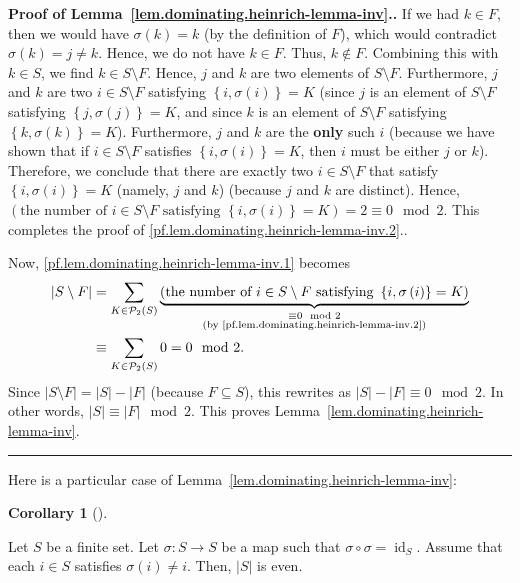 \documentclass[numbers=enddot,12pt,final,onecolumn,notitlepage]{scrartcl}%
\theoremstyle{definition}
\newtheorem{coro}[theo]{Corollary}
\newenvironment{corollary}[1][]
{\begin{coro}[#1]\begin{leftbar}}
{\end{leftbar}\end{coro}}
\newenvironment{proof}[1][Proof]{\noindent\textbf{#1.} }{\ \rule{0.5em}{0.5em}}
\let\sumnonlimits\sum
\renewcommand{\sum}{\sumnonlimits\limits}
\newcommand{\id}{\operatorname{id}}
\newcommand{\powset}[2][]{\ifthenelse{\equal{#2}{}}{\mathcal{P}\left(#1\right)}{\mathcal{P}_{#1}\left(#2\right)}}
\newcommand{\set}[1]{\left\{ #1 \right\}}
\newcommand{\abs}[1]{\left| #1 \right|}
\newcommand{\tup}[1]{\left( #1 \right)}
\begin{document}
\begin{proof}[Proof of Lemma~\ref{lem.dominating.heinrich-lemma-inv}.]
{If we had $k \in F$, then we would have $\sigma\tup{k} = k$ (by the
definition of $F$), which would contradict $\sigma\tup{k} = j \neq k$.
Hence, we do not have $k \in F$. Thus, $k \notin F$. Combining this
with $k \in S$, we find $k \in S \setminus F$. Hence, $j$ and $k$ are
two elements of $S \setminus F$. Furthermore, $j$ and $k$ are two
$i \in S \setminus F$ satisfying $\set{i, \sigma\tup{i}} = K$ (since
$j$ is an element of $S \setminus F$ satisfying
$\set{j, \sigma\tup{j}} = K$, and since $k$ is an element of
$S \setminus F$ satisfying $\set{k, \sigma\tup{k}} = K$). Furthermore,
$j$ and $k$ are the \textbf{only} such $i$ (because we have shown that
if $i \in S \setminus F$ satisfies $\set{i, \sigma\tup{i}} = K$, then
$i$ must be either $j$ or $k$). Therefore, we conclude that there are
exactly two $i \in S \setminus F$ that satisfy
$\set{i, \sigma\tup{i}} = K$ (namely, $j$ and $k$) (because $j$ and
$k$ are distinct). Hence,
$\tup{ \text{the number of } i \in S \setminus F
        \text{ satisfying } \set{i, \sigma\tup{i}} = K }
= 2 \equiv 0 \mod 2$. This completes the proof of
\eqref{pf.lem.dominating.heinrich-lemma-inv.2}.}.

Now, \eqref{pf.lem.dominating.heinrich-lemma-inv.1} becomes
\begin{align*}
\abs{S \setminus F}
&= \sum_{K \in \powset[2]{S}}
      \underbrace{\tup{ \text{the number of } i \in S \setminus F
                   \text{ satisfying } \set{i, \sigma\tup{i}} = K }}
                 _{\substack{\equiv 0 \mod 2 \\
                              \text{(by \eqref{pf.lem.dominating.heinrich-lemma-inv.2})}}}
\\
& \equiv \sum_{K \in \powset[2]{S}} 0 = 0 \mod 2 .
\end{align*}
Since $\abs{S \setminus F} = \abs{S} - \abs{F}$ (because
$F \subseteq S$), this rewrites as
$\abs{S} - \abs{F} \equiv 0 \mod 2$. In other words,
$\abs{S} \equiv \abs{F} \mod 2$. This proves
Lemma~\ref{lem.dominating.heinrich-lemma-inv}.
\end{proof}

Here is a particular case of
Lemma~\ref{lem.dominating.heinrich-lemma-inv}:

\begin{corollary} \label{cor.dominating.heinrich-lemma-inv0}
Let $S$ be a finite set. Let $\sigma : S \to S$ be a map such that
$\sigma \circ \sigma = \id_S$. Assume that each $i \in S$
satisfies $\sigma\tup{i} \neq i$. Then,
$\abs{S}$ is even.
\end{corollary}
\end{document}
